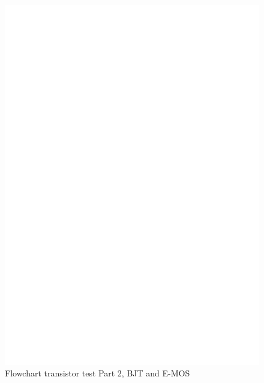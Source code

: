 \begin{figure}[H]
\centering
\includegraphics[]{../FIG/CheckSemi2.eps}
\caption{Flowchart transistor test Part 2, BJT and E-MOS}
\label{fig:ChkSemi2}
\end{figure}

